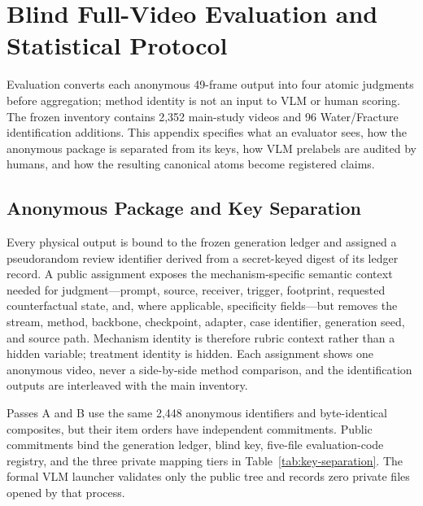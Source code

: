 \section{Blind Full-Video Evaluation and Statistical Protocol}
\label{app:evaluation-metrics}

Evaluation converts each anonymous 49-frame output into four atomic judgments
before aggregation; method identity is not an input to VLM or human scoring.
The frozen inventory contains 2,352 main-study videos and 96 Water/Fracture
identification additions.  This appendix specifies what an evaluator sees,
how the anonymous package is separated from its keys, how VLM prelabels are
audited by humans, and how the resulting canonical atoms become registered
claims.

\subsection{Anonymous Package and Key Separation}
\label{app:anonymous-package}

Every physical output is bound to the frozen generation ledger and assigned a
pseudorandom review identifier derived from a secret-keyed digest of its ledger
record.  A public assignment exposes the mechanism-specific semantic context
needed for judgment---prompt, source, receiver, trigger, footprint, requested
counterfactual state, and, where applicable, specificity fields---but removes
the stream, method, backbone, checkpoint, adapter, case identifier, generation
seed, and source path.  Mechanism identity is therefore rubric context rather
than a hidden variable; treatment identity is hidden.  Each assignment shows
one anonymous video, never a side-by-side method comparison, and the
identification outputs are interleaved with the main inventory.

Passes A and B use the same 2,448 anonymous identifiers and byte-identical
composites, but their item orders have independent commitments.  Public
commitments bind the generation ledger, blind key, five-file evaluation-code
registry, and the three private mapping tiers in
Table~\ref{tab:key-separation}.  The formal VLM launcher validates only the
public tree and records zero private files opened by that process.

